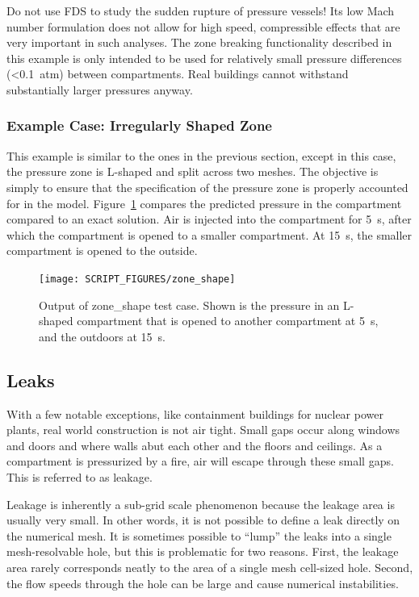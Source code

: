 \documentclass[11pt]{book}
\begin{document}
Do not use FDS to study the sudden rupture of pressure vessels! Its low Mach number formulation does not allow for high speed, compressible effects that
are very important in such analyses. The zone breaking functionality described in this example is only intended to be used for relatively small pressure differences (<0.1~atm) between compartments. Real buildings cannot withstand substantially larger pressures anyway.

\subsubsection{Example Case: Irregularly Shaped Zone}
\label{zone_shape}

This example is similar to the ones in the previous section, except in this case, the pressure zone is L-shaped and split across two meshes. The objective is simply to ensure that the specification of the pressure zone is properly accounted for in the model. Figure~\ref{zone_shape_fig} compares the predicted pressure in the compartment compared to an exact solution. Air is injected into the compartment for 5~s, after which the compartment is opened to a smaller compartment. At 15~s, the smaller compartment is opened to the outside.

\begin{figure}[ht]
\centering
\texttt{[image: SCRIPT\_FIGURES/zone\_shape]}
\caption[Results of the {\ct zone\_shape} test case]{Output of {\ct zone\_shape} test case. Shown is the pressure in an L-shaped compartment that is opened to another compartment at 5~s, and the outdoors at 15~s.}
\label{zone_shape_fig}
\end{figure}



\subsection{Leaks}
\label{info:Leaks}

With a few notable exceptions, like containment buildings for nuclear power plants, real world construction is not air tight.  Small gaps occur along windows and doors and where walls abut each other and the floors and ceilings.  As a compartment is pressurized by a fire, air will escape through these small gaps.  This is referred to as leakage.

Leakage is inherently a sub-grid scale phenomenon because the leakage area is usually very small. In other words, it is not possible to define a leak directly on the
numerical mesh. It is sometimes possible to ``lump'' the leaks into a single mesh-resolvable hole, but this is problematic
for two reasons. First, the leakage area rarely corresponds neatly to the area of a single mesh cell-sized hole. Second, the
flow speeds through the hole can be large and cause numerical instabilities.
\end{document}
